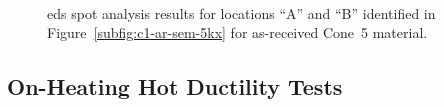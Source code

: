 \begin{figure}
\centering
{} \\
\caption[]{\Gls{eds} spot analysis results for locations ``A'' and ``B'' identified in Figure~\ref{subfig:c1-ar-sem-5kx} for as-received Cone~5 material.}
\label{fig:c5-ar-eds}
\end{figure}


\subsection{On-Heating Hot Ductility Tests}
